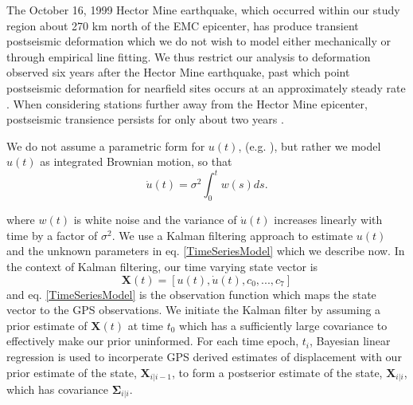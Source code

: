 \documentclass[12pt]{article}
\begin{document}
The October 16, 1999 Hector Mine earthquake, which occurred within our study region about 270 km north of the EMC epicenter, has produce transient postseismic deformation which we do not wish to model either mechanically or through empirical line fitting. We thus restrict our analysis to deformation observed six years after the Hector Mine earthquake, past which point postseismic deformation for nearfield sites occurs at an approximately steady rate \cite{Savage2009}. When considering stations further away from the Hector Mine epicenter, postseismic transience persists for only about two years \cite{Spinler2015}.

We do not assume a parametric form for $u(t)$, (e.g. \cite{Rollins2015}), but rather we model $u(t)$ as integrated Brownian motion, so that 
\begin{equation}
    \dot{u}(t) = \sigma^2\int_0^t w(s) ds.
\end{equation}    

where $w(t)$ is white noise and the variance of $\dot{u}(t)$ increases linearly with time by a factor of $\sigma^2$. We use a
Kalman filtering approach to estimate $u(t)$ and the unknown parameters in eq. \ref{TimeSeriesModel} which we describe now.  In the context of Kalman filtering, our time varying state vector is
\begin{equation}
    \mathbf{X}(t) = [u(t),\dot u(t), c_0, ..., c_7]
\end{equation}
and eq. \ref{TimeSeriesModel} is the observation function which maps the state vector to the GPS observations. We initiate the Kalman filter by assuming a prior estimate of $\mathbf{X}(t)$ at time $t_0$ which has a sufficiently large covariance to effectively make our prior uninformed.  For each time epoch, $t_i$, Bayesian linear regression is used to incorperate GPS derived estimates of displacement with our prior estimate of the state, $\mathbf{X}_{i|i-1}$, to form a postserior estimate of the state, $\mathbf{X}_{i|i}$, which has covariance $\mathbf{\Sigma}_{i|i}$.  
\end{document}
